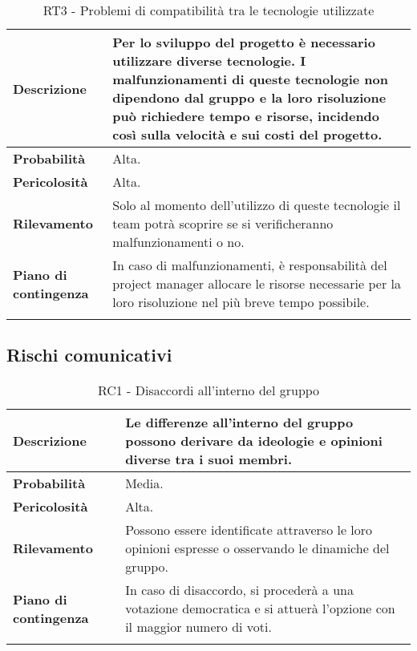 \begin{longtable}{ | l | p{10cm} | }
    \hline
    \textbf{Descrizione} & Per lo sviluppo del progetto è necessario utilizzare diverse tecnologie. I malfunzionamenti di queste tecnologie non dipendono dal gruppo e la loro risoluzione può richiedere tempo e risorse, incidendo così sulla velocità e sui costi del progetto. \\
    \hline
    \textbf{Probabilità} & Alta. \\
    \hline
    \textbf{Pericolosità} & Alta. \\
    \hline
    \textbf{Rilevamento} & Solo al momento dell'utilizzo di queste tecnologie il team potrà scoprire se si verificheranno malfunzionamenti o no.  \\
    \hline
    \textbf{Piano di contingenza} & In caso di malfunzionamenti, è responsabilità del project manager allocare le risorse necessarie per la loro risoluzione nel più breve tempo possibile.\\
    \hline
    \caption{RT3 - Problemi di compatibilità tra le tecnologie utilizzate}
    \label{table:7}
\end{longtable}


\newpage


\subsection{Rischi comunicativi}
\begin{longtable}{ | l | p{10cm} | }
    \hline
    \textbf{Descrizione} & Le differenze all'interno del gruppo possono derivare da ideologie e opinioni diverse tra i suoi membri. \\
    \hline
    \textbf{Probabilità} & Media. \\
    \hline
    \textbf{Pericolosità} & Alta. \\
    \hline
    \textbf{Rilevamento} & Possono essere identificate attraverso le loro opinioni espresse o osservando le dinamiche del gruppo. \\
    \hline
    \textbf{Piano di contingenza} & In caso di disaccordo, si procederà a una votazione democratica e si attuerà l'opzione con il maggior numero di voti. \\
    \hline
    \caption{RC1 - Disaccordi all'interno del gruppo}
    \label{table:8}
\end{longtable}

